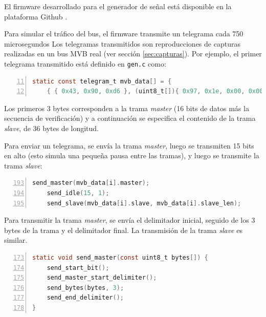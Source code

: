 El firmware desarrollado para el generador de señal está disponible en la plataforma Github \cite{mvbgen}.

Para simular el tráfico del bus, el firmware transmite un telegrama cada 750 microsegundos
Los telegramas transmitidos son reproducciones de capturas realizadas en un bus MVB real (ver sección \ref{sec:capturas}). Por ejemplo, el primer telegrama transmitido está definido en \texttt{gen.c} como:

\begin{lstlisting}[numberstyle=\footnotesize\ttfamily,language=C,breaklines=true,numbers=left,firstnumber=11,backgroundcolor=\color{light-gray},xleftmargin=1cm]
static const telegram_t mvb_data[] = {
    { { 0x43, 0x90, 0xd6 }, (uint8_t[]){ 0x97, 0x1e, 0x00, 0x00, 0x00, 0x82, 0x14, 0x06, 0xdf, 0x1e, 0x0b, 0x31, 0x0f, 0x00, 0x17, 0x05, 0x8c, 0xf8, 0x00, 0x00, 0x00, 0x00, 0x00, 0x00, 0x03, 0x4d, 0xc9, 0x11, 0x94, 0x11, 0xa8, 0x11, 0xa8, 0x04, 0x05, 0x88 }, 36 },
\end{lstlisting}

Los primeros 3 bytes corresponden a la trama \textit{master} (16 bits de datos más la secuencia de verificación) y a continuación se especifica el contenido de la trama \textit{slave}, de 36 bytes de longitud.

Para enviar un telegrama, se envía la trama \textit{master}, luego se transmiten 15 bits en alto (esto simula una pequeña pausa entre las tramas), y luego se transmite la trama \textit{slave}:

\begin{lstlisting}[numberstyle=\footnotesize\ttfamily,language=C,breaklines=true,numbers=left,firstnumber=193,backgroundcolor=\color{light-gray},xleftmargin=1cm]
    send_master(mvb_data[i].master);
    send_idle(15, 1);
    send_slave(mvb_data[i].slave, mvb_data[i].slave_len);
\end{lstlisting}

Para transmitir la trama \textit{master}, se envía el delimitador inicial, seguido de los 3 bytes de la trama y el delimitador final. La transmisión de la trama \textit{slave} es similar.

\begin{lstlisting}[numberstyle=\footnotesize\ttfamily,language=C,breaklines=true,numbers=left,firstnumber=173,backgroundcolor=\color{light-gray},xleftmargin=1cm]
static void send_master(const uint8_t bytes[]) {
    send_start_bit();
    send_master_start_delimiter();
    send_bytes(bytes, 3);
    send_end_delimiter();
}
\end{lstlisting}

